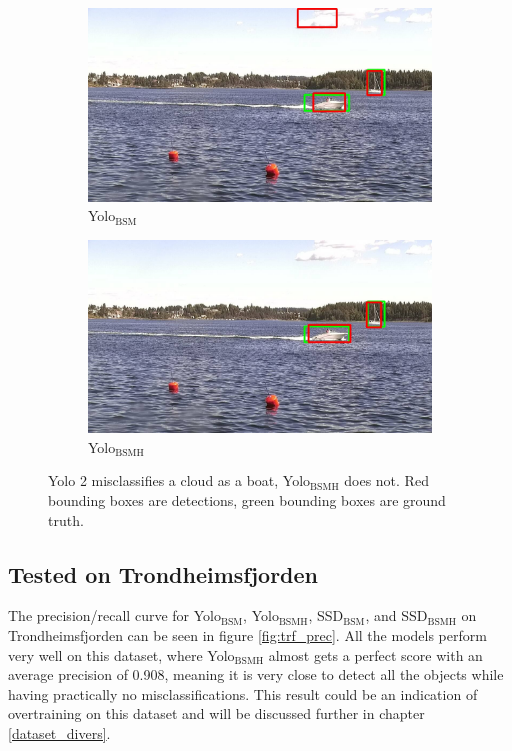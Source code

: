 \begin{figure}[h!]
\begin{subfigure}{.5\textwidth}
  \centering
  \includegraphics[width=0.9\linewidth]{results/case_buildings/yolo23/grove/yolo2/selected_06_25_frame0357.jpg}
  \caption{Yolo$_{\text{BSM}}$}
  \label{fig:misclass_yolo2}
\end{subfigure}%
\begin{subfigure}{.5\textwidth}
  \centering
  \includegraphics[width=.9\linewidth]{results/case_buildings/yolo23/grove/yolo3/selected_06_25_frame0357.jpg}
  \caption{Yolo$_{\text{BSMH}}$}
  \label{fig:misclass_yolo3}
\end{subfigure}
\caption{Yolo 2 misclassifies a cloud as a boat, Yolo$_{\text{BSMH}}$ does not. Red bounding boxes are detections, green bounding boxes are ground truth.}
\label{img:misclass_yolo}
\end{figure}

\newpage

\subsection{Tested on Trondheimsfjorden}
\label{sec:test_on_trf}

The precision/recall curve for Yolo$_{\text{BSM}}$, Yolo$_{\text{BSMH}}$, SSD$_{\text{BSM}}$, and SSD$_{\text{BSMH}}$ on Trondheimsfjorden can be seen in figure \ref{fig:trf_prec}. All the models perform very well on this dataset, where Yolo$_{\text{BSMH}}$ almost gets a perfect score with an average precision of 0.908, meaning it is very close to detect all the objects while having practically no misclassifications. This result could be an indication of overtraining on this dataset and will be discussed further in chapter \ref{dataset_divers}. 

